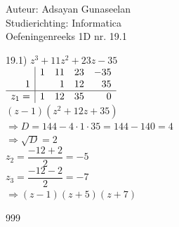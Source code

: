 \documentclass[a4paper]{article}
\begin{document}
\noindent \large Auteur: Adsayan Gunaseelan \\
\noindent \large Studierichting: Informatica\\
\noindent \large Oefeningenreeks 1D nr. 19.1\\

\medskip

\normalsize
19.1) $z^3+11z^2+23z-35$\\

$\\
\begin{array}{r|rrrr}
       & 1 & 11 & 23 & -35 \\
     1 &   & 1  & 12 & 35 \\
\hline
  z_1= & 1 & 12 & 35 & 0
\end{array}
$\\

$(z-1)(z^2+12z+35)$\\

$\Rightarrow D = 144-4\cdot1\cdot35 = 144-140 =4$\\

$\Rightarrow \sqrt{D}=2$\\

$z_2 = \dfrac{-12+2}{2}=-5$\\

$z_3 = \dfrac{-12-2}{2}=-7$\\

$\Rightarrow (z-1)(z+5)(z+7)$\\

\begin{thebibliography}{999}
\end{thebibliography}
\end{document}
